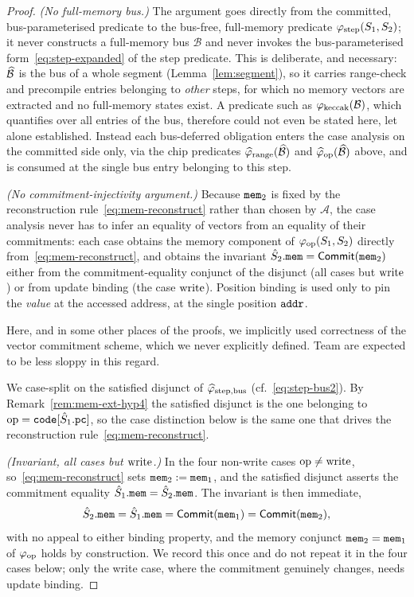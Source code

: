 \begin{proof}
\smallskip
\noindent\emph{(No full-memory bus.)} The argument goes directly from the
committed, bus-parameterised predicate to the bus-free, full-memory predicate
$\varphi_{\mathrm{step}}(S_1,S_2)$; it never constructs a full-memory bus $\mathcal{B}$
and never invokes the bus-parameterised
form~\eqref{eq:step-expanded} of the step predicate.  This is deliberate, and
necessary: $\widehat{\mathcal{B}}$ is the bus of a whole segment
(Lemma~\ref{lem:segment}), so it carries range-check and precompile entries
belonging to \emph{other} steps, for which no memory vectors are extracted and
no full-memory states exist.  A predicate such as
$\varphi_{\mathrm{keccak}}(\mathcal{B})$, which quantifies over all entries of the bus,
therefore could not even be stated here, let alone established.  Instead each
bus-deferred obligation enters the case analysis on the committed side only, via
the chip predicates $\widehat{\varphi}_{\mathrm{range}}(\widehat{\mathcal{B}})$ and
$\widehat{\varphi}_{\mathrm{op}}(\widehat{\mathcal{B}})$ above, and is consumed at the single
bus entry belonging to this step.

\smallskip
\noindent\emph{(No commitment-injectivity argument.)} Because $\mathtt{mem}_2$ is
fixed by the reconstruction rule~\eqref{eq:mem-reconstruct} rather than chosen
by $\mathcal{A}$, the case analysis never has to infer an equality of vectors
from an equality of their commitments: each case obtains the memory component
of $\varphi_{\mathrm{op}}(S_1,S_2)$ directly from~\eqref{eq:mem-reconstruct}, and
obtains the invariant $\hat{S}_2.\mathtt{mem}=\mathsf{Commit}(\mathtt{mem}_2)$ either from the
commitment-equality conjunct of the disjunct (all cases but $\mathrm{write}$) or from
update binding (the case $\mathrm{write}$).  Position binding is used only to pin the
\emph{value} at the accessed address, at the single position $\mathtt{addr}$.
\begin{instruction}
  Here, and in some other places of the proofs, we implicitly used correctness of the vector commitment scheme, which we never explicitly defined. Team are expected to be less sloppy in this regard.
\end{instruction}

\smallskip

We case-split on the satisfied disjunct of $\widehat{\varphi}_{\mathrm{step},\mathrm{bus}}$
(cf.~\eqref{eq:step-bus2}).  By Remark~\ref{rem:mem-ext-hyp4} the satisfied
disjunct is the one belonging to $\mathrm{op}=\mathtt{code}[\hat{S}_1.\mathtt{pc}]$, so the case
distinction below is the same one that drives the reconstruction
rule~\eqref{eq:mem-reconstruct}.

\smallskip
\noindent\emph{(Invariant, all cases but $\mathrm{write}$.)} In the four non-write cases
$\mathrm{op}\neq\mathrm{write}$, so~\eqref{eq:mem-reconstruct} sets $\mathtt{mem}_2:=\mathtt{mem}_1$, and the
satisfied disjunct asserts the commitment equality
$\hat{S}_1.\mathtt{mem}=\hat{S}_2.\mathtt{mem}$.  The invariant is then immediate,
\[
  \hat{S}_2.\mathtt{mem}=\hat{S}_1.\mathtt{mem}=\mathsf{Commit}(\mathtt{mem}_1)=\mathsf{Commit}(\mathtt{mem}_2),
\]
with no appeal to either binding property, and the memory conjunct
$\mathtt{mem}_2=\mathtt{mem}_1$ of $\varphi_{\mathrm{op}}$ holds by construction.  We record this once
and do not repeat it in the four cases below; only the write case, where the
commitment genuinely changes, needs update binding.


\end{proof}
